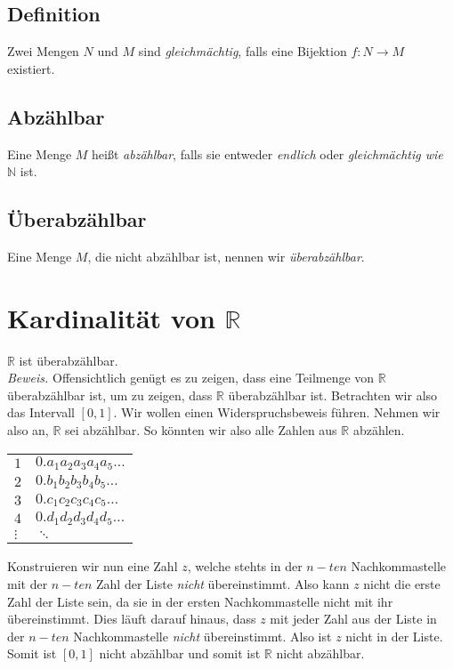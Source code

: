 \documentclass{scrreprt}
\newenvironment{proof}{\emph{\\Beweis.}}{}
\newcommand{\NN}{\mathbb{N}}
\newcommand{\RR}{\mathbb{R}}
\begin{document}
		\subsection{Definition}
		Zwei Mengen $N$ und $M$ sind \emph{gleichmächtig}, falls eine Bijektion $f: N \longrightarrow M$ existiert.
		\subsection{Abzählbar}
		Eine Menge $M$ heißt \emph{abzählbar}, falls sie entweder \emph{endlich} oder \emph{gleichmächtig wie $\NN$} ist.
		\subsection{Überabzählbar}
		Eine Menge $M$, die nicht abzählbar ist, nennen wir \emph{überabzählbar}.

	\section{Kardinalität von $\RR$}
	$\RR$ ist überabzählbar.
	\begin{proof}
		Offensichtlich genügt es zu zeigen, dass eine Teilmenge von $\RR$ überabzählbar ist, um zu zeigen, dass $\RR$ überabzählbar ist. Betrachten wir also das Intervall $[0,1]$. Wir wollen einen Widerspruchsbeweis führen. Nehmen wir also an, $\RR$ sei abzählbar. So könnten wir also alle Zahlen aus $\RR$ abzählen.\\
		\begin{center}
			\begin{tabular}{ll}
				$1$ & $0.a_1 a_2 a_3 a_4 a_5 \dots$\\
				$2$ & $0.b_1 b_2 b_3 b_4 b_5 \dots$\\
				$3$ & $0.c_1 c_2 c_3 c_4 c_5 \dots$\\
				$4$ & $0.d_1 d_2 d_3 d_4 d_5 \dots$\\
				$\vdots$ & $\ddots$  
			\end{tabular}
		\end{center}
		Konstruieren wir nun eine Zahl $z$, welche stehts in der $n-ten$ Nachkommastelle mit der $n-ten$ Zahl der Liste \emph{nicht} übereinstimmt. Also kann $z$ nicht die erste Zahl der Liste sein, da sie in der ersten Nachkommastelle nicht mit ihr übereinstimmt. Dies läuft darauf hinaus, dass $z$ mit jeder Zahl aus der Liste in der $n-ten$ Nachkommastelle \emph{nicht} übereinstimmt. Also ist $z$ nicht in der Liste. Somit ist $[0,1]$ nicht abzählbar und somit ist $\RR$ nicht abzählbar.
	\end{proof}
\end{document}
